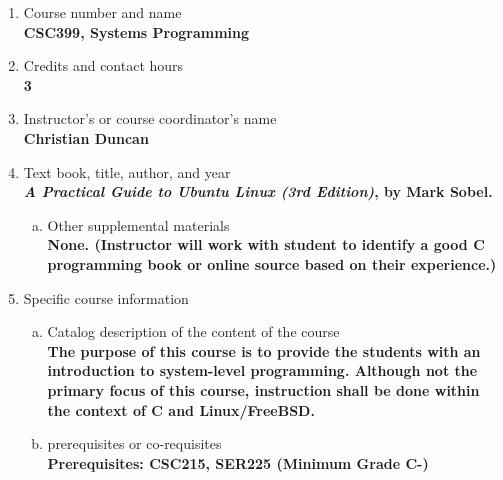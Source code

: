 \label{CSC399-Systems}  %
\begin{enumerate}[1.]
\item Course number and name\\
  {\bfseries
    CSC399, Systems Programming
  }
  
\item Credits and contact hours\\
  {\bfseries
    3    
  }

\item Instructor's or course coordinator's name\\
  {\bfseries
    Christian Duncan    
  }

\item Text book, title, author, and year\\
  {\bfseries
    {\em A Practical Guide to Ubuntu Linux (3rd Edition)}, by Mark Sobel.
    }
\begin{enumerate}[a.]
\item Other supplemental materials\\
  {\bfseries
    None. (Instructor will work with student to identify a good C programming book or online source based on their experience.)
  }
\end{enumerate}

\item Specific course information
\begin{enumerate}[a.]  
\item Catalog description of the content of the course\\
  {\bfseries
The purpose of this course is to provide the students with an introduction to system-level programming.
Although not the primary focus of this course, instruction shall be done
within the context of C and Linux/FreeBSD.
}

\item prerequisites or co-requisites\\
  {\bfseries
    Prerequisites: CSC215, SER225 (Minimum Grade C-)
  }


\end{enumerate}
\end{enumerate}

